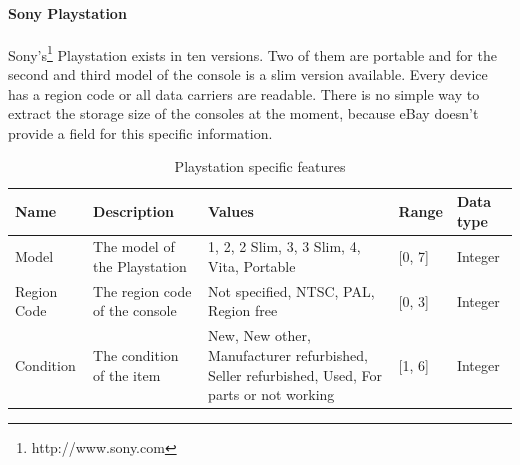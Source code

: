 \paragraph{Sony Playstation}
Sony's\footnote{http://www.sony.com} Playstation exists in ten versions. Two of them are portable and for the second and third model of the console is a slim version available. Every device has a region code or all data carriers are readable. There is no simple way to extract the storage size of the consoles at the moment, because eBay doesn't provide a field for this specific information.
\begin{table}[h!]
	\begin{center}
	\begin{tabular}{| p{2.6cm} | p{2.6cm} | p{2.6cm} | p{2.6cm} | p{2.6cm} |}
		\hline
		Name & Description & Values & Range & Data type \\
		\hline
		Model & The model of the Playstation & 1, 2, 2 Slim, 3, 3 Slim, 4, Vita, Portable & [0, 7] & Integer \\
		\hline
		Region Code & The region code of the console & Not specified, NTSC, PAL, Region free & [0, 3] & Integer \\
		\hline
		Condition & The condition of the item & New, New other, Manufacturer refurbished, Seller refurbished, Used, For parts or not working & [1, 6] & Integer \\
		\hline
	\end{tabular}
	\end{center}
	\caption{Playstation specific features}
\end{table}

